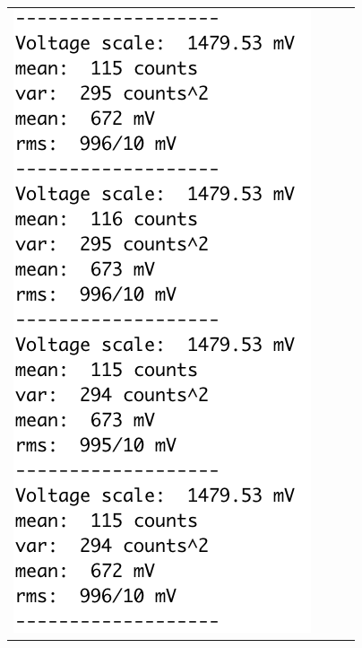 \documentclass[12pt]{article}
\begin{document}
\begin{figure}[htbp]
\begin{center}
\begin{tabular}{cccc}
{\includegraphics[height=0.30\textheight]{figs/calibb.png}} &

\end{tabular}
\end{center}
\end{figure}
\end{document}
